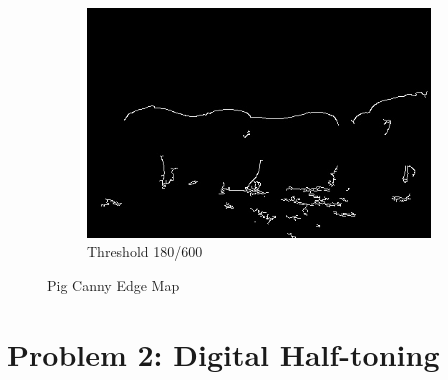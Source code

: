 \documentclass[12pt]{article}
\begin{document}
\begin{figure}[H]
\begin{subfigure}{0.32\textwidth}
		\centering
		\includegraphics[width=\textwidth]{PigCanny180_600.jpg}
		\caption{Threshold 180/600}
		\label{fig:PigCanny.180_600}
	\end{subfigure}
	\caption{Pig Canny Edge Map}
	\label{p1b2}
\end{figure}


\section*{Problem 2: Digital Half-toning}
\end{document}

